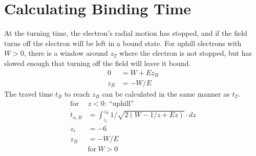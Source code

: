 \documentclass[aps,pra,preprint,groupedaddress]{revtex4-1}
\begin{document}
\section{\label{sec:calcE0} Calculating Binding Time}

At the turning time, the electron's radial motion has stopped, and if the field turns off the electron will be left in a bound state. For uphill electrons with $W > 0$, there is a window around $z_T$ where the electron is not stopped, but has slowed enough that turning off the field will leave it bound.
\begin{align*}
0 & = W + E z_B \\
z_B & = -W/E
\end{align*}
The travel time $t_B$ to reach $z_B$ can be calculated in the same manner as $t_T$.
\begin{align*}
\text{for} ~ & z < 0: ~ \text{``uphill''} \\
t_{u,B} & = \int_{z_i}^{z_B} 1/\sqrt{2(W - 1/z + Ez)} \cdot dz \\
z_i & = -6 \\
z_B & = -W/E \\
 & \text{for} ~ W > 0
\end{align*}
\end{document}
